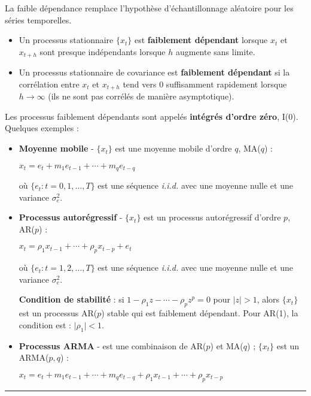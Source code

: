   \begin{f}

La faible dépendance remplace l'hypothèse d'échantillonnage aléatoire pour les séries temporelles.

\begin{itemize}[leftmargin=*]
	\item Un processus stationnaire $\lbrace x_{t} \rbrace$ est \textbf{faiblement dépendant} lorsque $x_{t}$ et $x_{t + h}$ sont presque indépendants lorsque $h$ augmente sans limite.
	\item Un processus stationnaire de covariance est \textbf{faiblement dépendant} si la corrélation entre $x_{t}$ et $x_{t + h}$ tend vers $0$ suffisamment rapidement lorsque $h \rightarrow \infty$ (ils ne sont pas corrélés de manière asymptotique).
\end{itemize}

Les processus faiblement dépendants sont appelés \textbf{intégrés d'ordre zéro}, I(0). Quelques exemples :

\begin{itemize}[leftmargin=*]
\item \textbf{Moyenne mobile} - $\lbrace x_{t} \rbrace$ est une moyenne mobile d'ordre $q$, MA($q$) :

\begin{center}
	$x_{t} = e_{t} + m_{1} e_{t - 1} + \cdots + m_{q} e_{t - q}$
\end{center}

où $\lbrace e_{t} : t = 0, 1, \ldots, T \rbrace$ est une séquence \textsl{i.i.d.} avec une moyenne nulle et une variance $\sigma^{2}_{e}$.

\item \textbf{Processus autorégressif} - $\lbrace x_{t} \rbrace$ est un processus autorégressif d'ordre $p$, AR($p$) :

\begin{center}
	$x_{t} = \rho_{1} x_{t - 1} + \cdots + \rho_{p} x_{t - p} + e_{t}$
\end{center}

où $\lbrace e_{t} : t = 1, 2, \ldots, T \rbrace$ est une séquence \textsl{i.i.d.} avec une moyenne nulle et une variance $\sigma^{2}_{e}$.

\textbf{Condition de stabilité} : si $1 - \rho_{1} z - \cdots - \rho_{p} z^{p} = 0$ pour $\lvert z \rvert > 1$, alors $\lbrace x_{t} \rbrace$ est un processus AR($p$) stable qui est faiblement dépendant. Pour AR(1), la condition est : $\lvert \rho_{1} \rvert < 1$.

\item \textbf{Processus ARMA} - est une combinaison de AR($p$) et MA($q$) ; $\lbrace x_{t} \rbrace$ est un ARMA($p, q$) :

\begin{center}
	$x_{t} = e_{t} + m_{1} e_{t - 1} + \cdots + m_{q} e_{t - q} + \rho_{1} x_{t - 1} + \cdots + \rho_{p} x_{t - p}$
\end{center}
\end{itemize}


		\end{f}  \hrule

